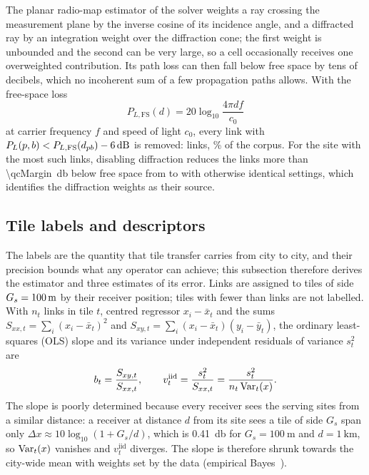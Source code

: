 The planar radio-map estimator of the solver weights a ray crossing the
measurement plane by the inverse cosine of its incidence angle, and a
diffracted ray by an integration weight over the diffraction cone; the
first weight is unbounded and the second can be very large, so a cell
occasionally receives one overweighted contribution. Its path loss can then
fall below free space by tens of decibels, which no incoherent sum of a few
propagation paths allows. With the free-space loss
\begin{equation}
P_{L,\mathrm{FS}}(d)=20\log_{10}\frac{4\pi d f}{c_0}
\label{eq:fspl}
\end{equation}
at carrier frequency $f$ and speed of light $c_0$, every link with
$\PL(p,b)<P_{L,\mathrm{FS}}(d_{pb})-\SI{\qcMargin}{\decibel}$ is removed:
\qcRemoved{} links, \qcShare\% of the corpus. For the site with the most
such links, disabling diffraction reduces the links more than
\SI{\qcMargin}{\decibel} below free space from \outDiffOn{} to \outDiffOff{}
with otherwise identical settings, which identifies the diffraction weights
as their source.

\subsection{Tile labels and descriptors}
\label{sec:labels}

The labels are the quantity that tile transfer carries from city to city,
and their precision bounds what any operator can achieve; this subsection
therefore derives the estimator and three estimates of its error. Links are
assigned to tiles of side $G_s=\SI{100}{\metre}$ by their receiver
position; tiles with fewer than \minLinks{} links are not labelled. With
$n_t$ links in tile $t$, centred regressor $x_i-\bar x_t$ and the sums
$S_{xx,t}=\sum_i(x_i-\bar x_t)^{2}$ and $S_{xy,t}=\sum_i(x_i-\bar x_t)(y_i-\bar y_t)$,
the ordinary least-squares (OLS) slope and its variance under independent
residuals of variance $s_t^{2}$ are
\begin{equation}
b_t=\frac{S_{xy,t}}{S_{xx,t}},\qquad
v_t^{\mathrm{iid}}=\frac{s_t^{2}}{S_{xx,t}}=\frac{s_t^{2}}{n_t\operatorname{Var}_t(x)} .
\label{eq:ols}
\end{equation}
The slope is poorly determined because every receiver sees the serving sites
from a similar distance: a receiver at distance $d$ from its site sees a tile
of side $G_s$ span only $\Delta x\approx10\log_{10}(1+G_s/d)$, which is
\SI{0.41}{\decibel} for $G_s=\SI{100}{\metre}$ and $d=\SI{1}{\kilo\metre}$,
so $\operatorname{Var}_t(x)$ vanishes and $v_t^{\mathrm{iid}}$ diverges. The slope is
therefore shrunk towards the city-wide mean with weights set by the data
(empirical Bayes~\cite{morris1983}).

